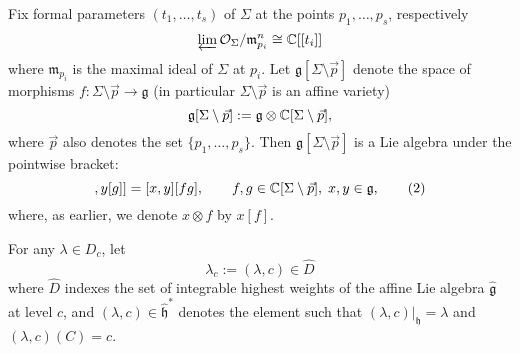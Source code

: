 \documentclass[12pt]{article}
\begin{document}
\medskip

Fix formal parameters $(t_1,\dots,t_s)$ of $\Sigma$ at the points $p_1,\dots,p_s$, respectively
\[\varprojlim \mathcal{O}_{\Sigma}/\mathfrak{m}_{p_i}^n \cong \mathbb{C}[[t_i]]\]
where $\mathfrak{m}_{p_i}$ is the maximal ideal of $\Sigma$ at $p_i$. Let $\mathfrak{g}[\Sigma \setminus \vec{p}]$ denote the space of morphisms
$f \colon \Sigma \setminus \vec{p} \to \mathfrak{g}$ (in particular $\Sigma \setminus \vec{p}$ is an affine variety)
\[
    \mathfrak{g}[\Sigma \setminus \vec{p}] := \mathfrak{g} \otimes \mathbb{C}[\Sigma \setminus \vec{p}],
\]
where $\vec{p}$ also denotes the set $\{p_1,\dots,p_s\}$.
Then $\mathfrak{g}[\Sigma \setminus \vec{p}]$ is a Lie algebra under the pointwise bracket:
\begin{equation}
    [x[f],y[g]] = [x,y][fg], \qquad f,g \in \C[\Sigma\setminus\vec{p}],\; x,y \in \mathfrak{g},
    \tag{2}
\end{equation}
where, as earlier, we denote $x \otimes f$ by $x[f]$.

For any $\lambda \in D_c$, let
\begin{equation}
    \lambda_c := (\lambda, c) \in \widehat{D}
    \tag{3}
\end{equation}
where $\widehat{D}$ indexes the set of integrable highest weights of the affine Lie algebra $\widehat{\mathfrak{g}}$ at level $c$, and $(\lambda,c)\in \widehat{\mathfrak{h}}^{*}$ denotes the element such that $(\lambda,c)|_{\mathfrak{h}}=\lambda$ and $(\lambda,c)(C)=c$.
\end{document}
